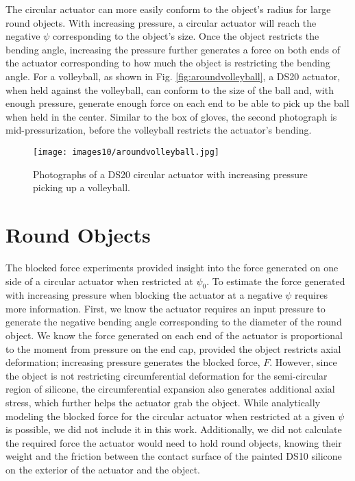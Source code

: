 The circular actuator can more easily conform to the object's radius for large round objects. With increasing pressure, a circular actuator will reach the negative $\psi$ corresponding to the object's size. Once the object restricts the bending angle, increasing the pressure further generates a force on both ends of the actuator corresponding to how much the object is restricting the bending angle. For a volleyball, as shown in Fig. \ref{fig:aroundvolleyball}, a DS20 actuator, when held against the volleyball, can conform to the size of the ball and, with enough pressure, generate enough force on each end to be able to pick up the ball when held in the center. Similar to the box of gloves, the second photograph is mid-pressurization, before the volleyball restricts the actuator's bending.
\\
\begin{figure}[ht]
    \centering
     \texttt{[image: images10/aroundvolleyball.jpg]}
    \caption{Photographs of a DS20 circular actuator with increasing pressure picking up a volleyball.}
    \label{fig:boxofgloves}
\end{figure}

\section{Round Objects}

The blocked force experiments provided insight into the force generated on one side of a circular actuator when restricted at $\psi_0$. To estimate the force generated with increasing pressure when blocking the actuator at a negative $\psi$ requires more information. First, we know the actuator requires an input pressure to generate the negative bending angle corresponding to the diameter of the round object. We know the force generated on each end of the actuator is proportional to the moment from pressure on the end cap, provided the object restricts axial deformation; increasing pressure generates the blocked force, $F$. However, since the object is not restricting circumferential deformation for the semi-circular region of silicone, the circumferential expansion also generates additional axial stress, which further helps the actuator grab the object. While analytically modeling the blocked force for the circular actuator when restricted at a given $\psi$ is possible, we did not include it in this work. Additionally, we did not calculate the required force the actuator would need to hold round objects, knowing their weight and the friction between the contact surface of the painted DS10 silicone on the exterior of the actuator and the object. 

